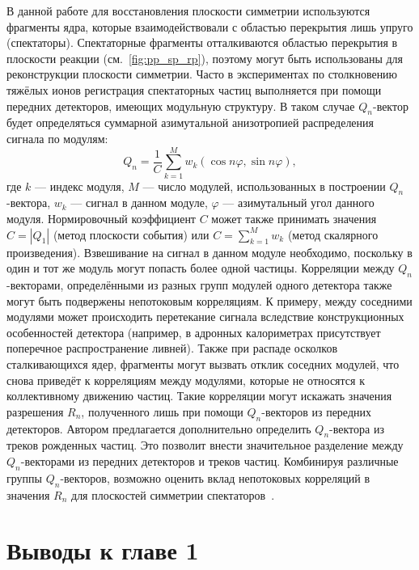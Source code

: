 В данной работе для восстановления плоскости симметрии используются фрагменты ядра, которые взаимодействовали с областью перекрытия лишь упруго (спектаторы). 
Спектаторные фрагменты отталкиваются областью перекрытия в плоскости реакции (см.~\ref{fig:pp_sp_rp}), поэтому могут быть использованы для реконструкции плоскости симметрии. 
Часто в экспериментах по столкновению тяжёлых ионов регистрация спектаторных частиц выполняется при помощи передних детекторов, имеющих модульную структуру. 
В таком случае $Q_n$-вектор будет определяться суммарной азимутальной анизотропией распределения сигнала по модулям:
%
\begin{equation}
    Q_n  = \frac{1}{C} \sum_{k=1}^M w_k ( \cos n \varphi, \sin n \varphi ),
\end{equation}
%
где $k$ --- индекс модуля, $M$ --- число модулей, использованных в построении $Q_n$-вектора, $w_k$ --- сигнал в данном модуле, $\varphi$ --- азимутальный угол данного модуля. 
Нормировочный коэффициент $C$ может также принимать значения $C=|Q_1|$ (метод плоскости события) или $C=\sum_{k=1}^M w_k$ (метод скалярного произведения).
Взвешивание на сигнал в данном модуле необходимо, поскольку в один и тот же модуль могут попасть более одной частицы.
Корреляции между $Q_n$-векторами, определёнными из разных групп модулей одного детектора также могут быть подвержены непотоковым корреляциям.
К примеру, между соседними модулями может происходить перетекание сигнала вследствие конструкционных особенностей детектора (например, в адронных калориметрах присутствует поперечное распространение ливней).
Также при распаде осколков сталкивающихся ядер, фрагменты могут вызвать отклик соседних модулей, что снова приведёт к корреляциям между модулями, которые не относятся к коллективному движению частиц.
Такие корреляции могут искажать значения разрешения $R_n$, полученного лишь при помощи $Q_n$-векторов из передних детекторов.
Автором предлагается дополнительно определить $Q_n$-вектора из треков рожденных частиц.
Это позволит внести значительное разделение между $Q_n$-векторами из передних детекторов и треков частиц.
Комбинируя различные группы $Q_n$-векторов, возможно оценить вклад непотоковых корреляций в значения $R_n$ для плоскостей симметрии спектаторов~\cite{Mamaev:2023fpr,Mamaev:2023yhz,Mamaev:2024}.

\section{Выводы к главе 1}

